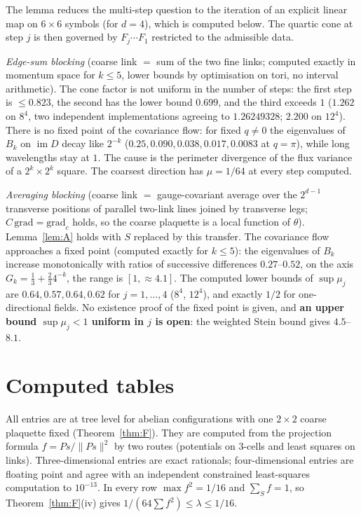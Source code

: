 \documentclass[11pt,a4paper]{article}
\theoremstyle{definition}
\theoremstyle{remark}
\newcommand{\im}{\operatorname{im}}
\begin{document}
The lemma reduces the multi-step question to the iteration of an explicit linear map on $6\times6$ symbols (for $d=4$), which is computed below. The quartic cone at step $j$ is then governed by $F_j\cdots F_1$ restricted to the admissible data.

\emph{Edge-sum blocking} (coarse link $=$ sum of the two fine links; computed exactly in momentum space for $k\le5$, lower bounds by optimisation on tori, no interval arithmetic). The cone factor is not uniform in the number of steps: the first step is $\le0.823$, the second has the lower bound $0.699$, and the third exceeds $1$ ($1.262$ on $8^4$, two independent implementations agreeing to $1.26249328$; $2.200$ on $12^4$). There is no fixed point of the covariance flow: for fixed $q\ne0$ the eigenvalues of $B_k$ on $\im D$ decay like $2^{-k}$ ($0.25,0.090,0.038,0.017,0.0083$ at $q=\pi$), while long wavelengths stay at $1$. The cause is the perimeter divergence of the flux variance of a $2^k\times2^k$ square. The coarsest direction has $\mu=1/64$ at every step computed.

\emph{Averaging blocking} (coarse link $=$ gauge-covariant average over the $2^{d-1}$ transverse positions of parallel two-link lines joined by transverse legs; $C\,\mathrm{grad}=\mathrm{grad}_c$ holds, so the coarse plaquette is a local function of $\theta$). Lemma~\ref{lem:A} holds with $S$ replaced by this transfer. The covariance flow approaches a fixed point (computed exactly for $k\le5$): the eigenvalues of $B_k$ increase monotonically with ratios of successive differences $0.27$--$0.52$, on the axis $G_k=\frac13+\frac23 4^{-k}$, the range is $[1,\approx4.1]$. The computed lower bounds of $\sup\mu_j$ are $0.64,0.57,0.64,0.62$ for $j=1,\dots,4$ ($8^4$, $12^4$), and exactly $1/2$ for one-directional fields. No existence proof of the fixed point is given, and \textbf{an upper bound $\sup\mu_j<1$ uniform in $j$ is open}: the weighted Stein bound gives $4.5$--$8.1$.

\section{Computed tables}\label{sec:tables}

All entries are at tree level for abelian configurations with one $2\times2$ coarse plaquette fixed (Theorem~\ref{thm:F}). They are computed from the projection formula $f=Ps/\|Ps\|^2$ by two routes (potentials on $3$-cells and least squares on links). Three-dimensional entries are exact rationals; four-dimensional entries are floating point and agree with an independent constrained least-squares computation to $10^{-13}$. In every row $\max f^2=1/16$ and $\sum_Sf=1$, so Theorem~\ref{thm:F}(iv) gives $1/(64\sum f^2)\le\lambda\le1/16$.
\end{document}
